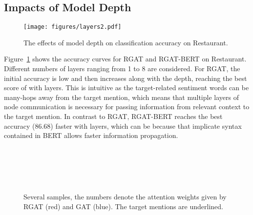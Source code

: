\documentclass[journal]{IEEEtran}
\begin{document}
	\subsection{Impacts of Model Depth}
	\begin{figure}[!t]
\centering\texttt{[image: figures/layers2.pdf]}
		\footnotesize\caption{The effects of model depth on classification accuracy on Restaurant.}
		\label{fig:03}
	\end{figure}
	Figure~\ref{fig:03} shows the accuracy curves for RGAT and RGAT-BERT on Restaurant. 
	Different numbers of layers ranging from 1 to 8 are considered.
	For RGAT, the initial accuracy is low and then increases along with the depth, reaching the best score of  with  layers.
	This is intuitive as the target-related sentiment words can be many-hops away from the target mention, which means that multiple layers of node communication is necessary for passing information from relevant context to the target mention.
	In contrast to RGAT, RGAT-BERT reaches the best accuracy (86.68) faster with  layers, which can be because that implicate syntax contained in BERT allows faster information propagation.
	\begin{figure}[!t]
		\centering 
		\\ \vspace{-5pt}        
		\\ \vspace{-5pt} 
		\\ \vspace{-5pt} 
		\\ 
		\caption{Several samples, the numbers denote the attention weights given by RGAT (red) and GAT (blue). The target mentions are underlined.	
		}
		\label{fig:example2}
	\end{figure}
\end{document}
